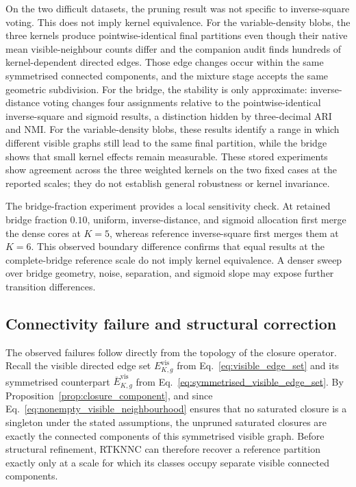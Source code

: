 \documentclass[pdflatex,sn-basic,Numbered]{sn-jnl}
\begin{document}
On the two difficult datasets, the pruning result was not specific to
inverse-square voting. This does not imply kernel equivalence. For the
variable-density blobs, the three kernels
produce pointwise-identical final partitions even though their native mean
visible-neighbour counts differ and the companion audit finds hundreds of
kernel-dependent directed edges.  Those edge changes occur within the same
symmetrised connected components, and the mixture stage accepts the same
geometric subdivision.  For the bridge, the stability is only approximate:
inverse-distance voting changes four assignments relative to the pointwise-identical inverse-square and sigmoid results, a distinction hidden by
three-decimal ARI and NMI. For the variable-density blobs, these results identify a range in which
different visible graphs still lead to the same final partition, while the
bridge shows that small kernel effects remain measurable. These stored
experiments show agreement across the three weighted kernels on the two fixed
cases at the reported scales; they do not establish general robustness or
kernel invariance.

The bridge-fraction experiment provides a local sensitivity check. At retained bridge
fraction $0.10$, uniform, inverse-distance, and sigmoid allocation first merge
the dense cores at $K=5$, whereas reference inverse-square first merges them
at $K=6$.  This observed boundary difference confirms that equal results at
the complete-bridge reference scale do not imply kernel equivalence.  A denser
sweep over bridge geometry, noise, separation, and sigmoid slope may expose
further transition differences.

\subsection{Connectivity failure and structural correction}

The observed failures follow directly from the topology of the closure
operator. Recall the visible directed edge set
$E^{\mathrm{vis}}_{K,g}$ from Eq.~\eqref{eq:visible_edge_set} and its
symmetrised counterpart
$\overline E^{\mathrm{vis}}_{K,g}$ from
Eq.~\eqref{eq:symmetrised_visible_edge_set}.
By Proposition~\ref{prop:closure_component}, and since
Eq.~\eqref{eq:nonempty_visible_neighbourhood} ensures that no saturated
closure is a singleton under the stated assumptions, the unpruned saturated
closures are exactly the connected components of this symmetrised visible graph.
Before structural refinement, RTKNNC
can therefore recover a reference partition exactly only at a scale for
which its classes occupy separate visible connected components.
\end{document}

